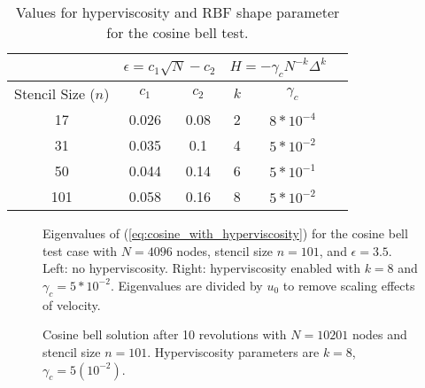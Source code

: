 \begin{table}[ht!]
\caption{Values for hyperviscosity and RBF shape parameter for the cosine bell test. }
\begin{center}
\begin{tabular}{|c|c|c|c|c|c|}
\hline		     & \multicolumn{2}{c|}{$\epsilon = c_1 \sqrt{N} - c_2$} & \multicolumn{2}{c|}{$H = -\gamma_{c} N^{-k} \Delta^{k}$ } \\ \hline
Stencil Size ($n$) & $c_{1}$ & $c_{2}$ & $k$ & $\gamma_c$ \\ \hline
17 & 0.026 & 0.08 & 2 & $8 * 10^{-4}$ \\
31 & 0.035 & 0.1 & 4 & $5 * 10^{-2}$ \\
50 & 0.044 & 0.14 & 6 & $5 * 10^{-1}$ \\
101 & 0.058 & 0.16 & 8 & $5 * 10^{-2}$ \\ \hline
\end{tabular}
\end{center}
\label{tbl:cos_hv_params}
\end{table}

\begin{figure}[ht!]
\begin{center}
\caption{Eigenvalues of (\ref{eq:cosine_with_hyperviscosity}) for the cosine bell test case with $N=4096$ nodes, stencil size $n=101$, and $\epsilon = 3.5$. Left: no hyperviscosity. Right: hyperviscosity enabled with $k=8$ and $\gamma_c = 5*10^{-2}$. Eigenvalues are divided by $u_0$ to remove scaling effects of velocity.  %
}
\label{fig:eig_cosine}
\end{center}
\end{figure}

\begin{figure}[ht!]
\begin{center}
\caption{Cosine bell solution after 10 revolutions with $N=10201$ nodes and stencil size $n=101$.
Hyperviscosity parameters are $k = 8$, $\gamma_c = 5(10^{-2})$. %
}
 \label{fig:cosine_10revs}
\end{center}
\end{figure}

